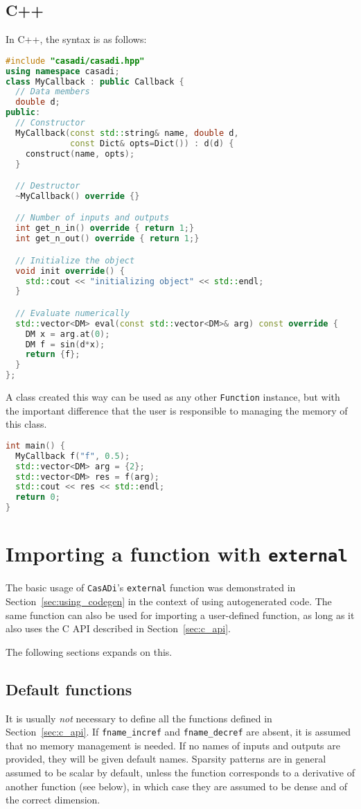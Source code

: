 \documentclass[a4paper,12pt]{book}
\newcommand{\CasADi}{\texttt{CasADi}\xspace}
\begin{document}
\subsection*{C++}
In C++, the syntax is as follows:
\begin{lstlisting}[language=C++]
#include "casadi/casadi.hpp"
using namespace casadi;
class MyCallback : public Callback {
  // Data members
  double d;
public:
  // Constructor
  MyCallback(const std::string& name, double d,
             const Dict& opts=Dict()) : d(d) {
    construct(name, opts);
  }

  // Destructor
  ~MyCallback() override {}

  // Number of inputs and outputs
  int get_n_in() override { return 1;}
  int get_n_out() override { return 1;}

  // Initialize the object
  void init override() {
    std::cout << "initializing object" << std::endl;
  }

  // Evaluate numerically
  std::vector<DM> eval(const std::vector<DM>& arg) const override {
    DM x = arg.at(0);
    DM f = sin(d*x);
    return {f};
  }
};
\end{lstlisting}

A class created this way can be used as any other \texttt{Function} instance,
but with the important difference that the user is responsible to managing
the memory of this class.

\begin{lstlisting}[language=C++]
int main() {
  MyCallback f("f", 0.5);
  std::vector<DM> arg = {2};
  std::vector<DM> res = f(arg);
  std::cout << res << std::endl;
  return 0;
}
\end{lstlisting}

\section{Importing a function with \texttt{external}} \label{sec:external}
The basic usage of \CasADi's \texttt{external} function was demonstrated in
Section~\ref{sec:using_codegen} in the context of using autogenerated code. The
same function can also be used for importing a user-defined function, as long as
it also uses the C API described in Section~\ref{sec:c_api}.

The following sections expands on this.

\subsection*{Default functions}
It is usually \emph{not} necessary to define all the functions defined in
Section~\ref{sec:c_api}. If \verb|fname_incref| and \verb|fname_decref|
are absent, it is assumed that no memory management is needed. If no
names of inputs and outputs are provided, they will be given default names.
Sparsity patterns are in general assumed to be scalar by default, unless the
function corresponds to a derivative of another function (see below), in which
case they are assumed to be dense and of the correct dimension.
\end{document}

